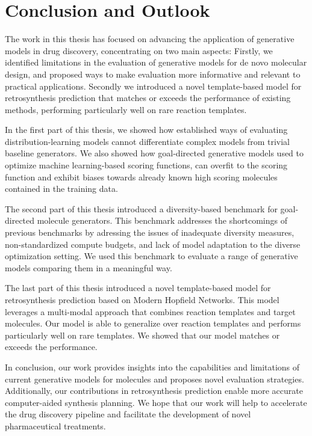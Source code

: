\chapter{Conclusion and Outlook\label{chap:conclusion}}
The work in this thesis has focused on
advancing the application of generative models in drug discovery, concentrating on two main aspects:
Firstly, we identified limitations in the evaluation of generative models for de novo molecular
design, and proposed ways to make evaluation more informative and relevant to practical
applications. Secondly we introduced a novel template-based model for retrosynthesis prediction
that matches or exceeds the performance of existing methods, performing particularly well on rare
reaction templates.

In the first part of this thesis, we showed how established ways of evaluating distribution-learning
models cannot differentiate complex models from trivial baseline generators. We also showed how
goal-directed generative models used to optimize machine learning-based scoring functions, can
overfit to the scoring function and exhibit biases towards already known high scoring molecules
contained in the training data.

The second part of this thesis introduced a diversity-based benchmark for goal-directed molecule
generators. This benchmark addresses the shortcomings of previous benchmarks by adressing the issues
of inadequate diversity measures, non-standardized compute budgets, and lack of model adaptation to
the diverse optimization setting. We used this benchmark to evaluate a range of generative models
comparing them in a meaningful way.

The last part of this thesis introduced a novel template-based model for retrosynthesis prediction
based on Modern Hopfield Networks. This model leverages a
multi-modal approach that combines reaction templates and target molecules. Our model is able to
generalize over reaction templates and performs particularly well on rare templates. We showed that
our model matches or exceeds the performance.



In conclusion, our work provides insights into the capabilities and limitations of current generative
models for molecules and proposes novel evaluation strategies. Additionally, our contributions in
retrosynthesis prediction enable more accurate computer-aided synthesis planning.
We hope that our work will help to accelerate the drug discovery pipeline and facilitate the development
of novel pharmaceutical treatments.